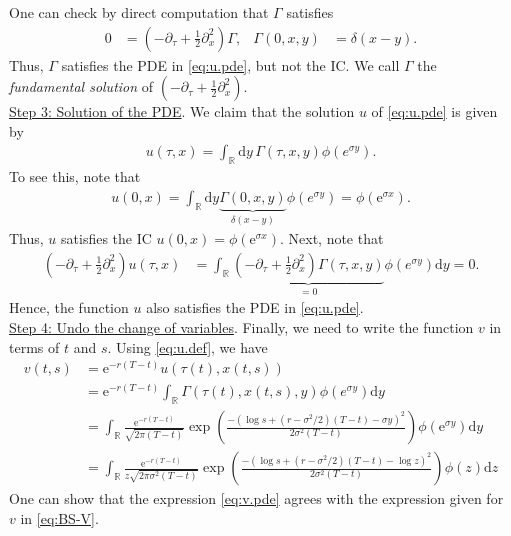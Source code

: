 \documentclass[12pt]{book}
\numberwithin{equation}{chapter}
\theoremstyle{plain}
\numberwithin{theorem}{section}
\theoremstyle{definition}
\numberwithin{exercise}{chapter}
\newcommand{\<}{\langle}
\renewcommand{\>}{\rangle}
\renewcommand{\(}{\left(}
\renewcommand{\)}{\right)}
\renewcommand{\[}{\left[}
\renewcommand{\]}{\right]}
\newcommand\Rb{\mathds{R}}
\newcommand\sig{\sigma}
\newcommand\Gam{\Gamma}
\newcommand\del{\delta}
\renewcommand\d{\partial}
\newcommand\dd{\mathrm{d}}
\newcommand\ee{\mathrm{e}}
\theoremstyle{definition}
\numberwithin{question}{section}
\begin{document}
One can check by direct computation that $\Gam$ satisfies 
\begin{align}
0
	&=	(-\d_\tau + \frac{1}{2}\d_x^2) \Gamma , &
\Gam(0,x,y)
	&=	\del(x-y) .
\end{align}
Thus, $\Gam$ satisfies the PDE in \eqref{eq:u.pde}, but not the IC.
We call $\Gamma$ the \textit{fundamental solution} of $(-\d_\tau + \tfrac{1}{2} \d_x^2 )$.
\\[0.5em]
\underline{Step 3: Solution of the PDE}.
We claim that the solution $u$ of \eqref{eq:u.pde} is given by
\begin{align}
	u(\tau,x) = \int_\Rb \dd y \, \Gamma(\tau,x,y) \phi(e^{\sig y}) .
\end{align}
To see this, note that
\begin{align}
	u(0,x) = \int_\Rb \dd y \underbrace{\Gamma(0,x,y)}_{\delta(x-y)} \phi(e^{\sig y}) = \phi(\ee^{\sig x}) .
\end{align}
Thus, $u$ satisfies the IC $u(0,x) = \phi(\ee^{\sig x})$.  Next, note that
\begin{align}
(-\d_\tau + \frac{1}{2} \d_x^2) u (\tau, x) 
		&= \int_\Rb \underbrace{(-\d_\tau + \frac{1}{2}\d_x^2) \Gamma(\tau,x,y)}_{=0} \phi(e^{\sig y}) \dd y = 0 .
\end{align}
Hence, the function $u$ also satisfies the PDE in \eqref{eq:u.pde}.
\\[0.5em]
\underline{Step 4: Undo the change of variables}.
Finally, we need to write the function $v$ in terms of $t$ and $s$.  Using \eqref{eq:u.def}, we have
\begin{align}
v(t,s)
	&=	\ee^{-r(T-t)} u(\tau(t),x(t,s)) \\
	&=	\ee^{-r(T-t)} \int_\Rb \Gamma(\tau(t),x(t,s),y) \phi(e^{\sig y}) \dd y \\
	&=	\int_\Rb \frac{\ee^{-r(T-t)} }{\sqrt{2\pi(T-t)}} \exp \( \frac{-(\log s + (r-\sig^2/2)(T-t) - \sig y )^2}{2 \sig^2 (T-t)}\)\phi(\ee^{\sig y}) \dd y \\
	&=	\int_\Rb \frac{\ee^{-r(T-t)} }{z \sqrt{2\pi \sig^2 (T-t)}} \exp \( \frac{-(\log s + (r-\sig^2/2)(T-t) - \log z )^2}{2 \sig^2 (T-t)}\)
			\phi(z) \dd z \label{eq:v.pde}
\end{align}
One can show that the expression \eqref{eq:v.pde} agrees with the expression given for $v$ in \eqref{eq:BS-V}.
\end{document}
